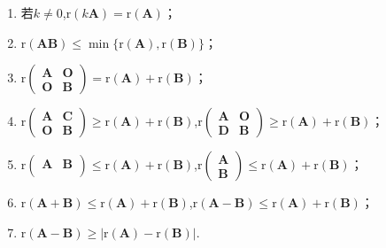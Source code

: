 \documentclass[lang=cn,newtx,10pt,scheme=chinese]{elegantbook}
\begin{document}
\begin{proposition}[矩阵秩的基本公式]\label{proposition:矩阵秩的基本公式}
\begin{enumerate}[(1)]
\item \label{矩阵秩的基本公式1}若\(k\neq0\),\(\mathrm{r}(k\boldsymbol{A})=\mathrm{r}(\boldsymbol{A})\)；

\item \label{矩阵秩的基本公式2}\(\mathrm{r}(\boldsymbol{A}\boldsymbol{B})\leq\min\{\mathrm{r}(\boldsymbol{A}),\mathrm{r}(\boldsymbol{B})\}\)；

\item \label{矩阵秩的基本公式3}\(\mathrm{r}\begin{pmatrix}\boldsymbol{A}&\boldsymbol{O}\\\boldsymbol{O}&\boldsymbol{B}\end{pmatrix}=\mathrm{r}(\boldsymbol{A})+\mathrm{r}(\boldsymbol{B})\)；

\item \label{矩阵秩的基本公式4}\(\mathrm{r}\begin{pmatrix}\boldsymbol{A}&\boldsymbol{C}\\\boldsymbol{O}&\boldsymbol{B}\end{pmatrix}\geq\mathrm{r}(\boldsymbol{A})+\mathrm{r}(\boldsymbol{B})\),\(\mathrm{r}\begin{pmatrix}\boldsymbol{A}&\boldsymbol{O}\\\boldsymbol{D}&\boldsymbol{B}\end{pmatrix}\geq\mathrm{r}(\boldsymbol{A})+\mathrm{r}(\boldsymbol{B})\)；

\item \label{矩阵秩的基本公式5}\(\mathrm{r}\left( \begin{matrix}
\boldsymbol{A}&		\boldsymbol{B}\\
\end{matrix} \right) \leq\mathrm{r}(\boldsymbol{A})+\mathrm{r}(\boldsymbol{B})\),\(\mathrm{r}\begin{pmatrix}\boldsymbol{A}\\\boldsymbol{B}\end{pmatrix}\leq\mathrm{r}(\boldsymbol{A})+\mathrm{r}(\boldsymbol{B})\)；

\item \label{矩阵秩的基本公式6}\(\mathrm{r}(\boldsymbol{A}+\boldsymbol{B})\leq\mathrm{r}(\boldsymbol{A})+\mathrm{r}(\boldsymbol{B})\),\(\mathrm{r}(\boldsymbol{A}-\boldsymbol{B})\leq\mathrm{r}(\boldsymbol{A})+\mathrm{r}(\boldsymbol{B})\)；

\item \label{矩阵秩的基本公式7}\(\mathrm{r}(\boldsymbol{A}-\boldsymbol{B})\geq|\mathrm{r}(\boldsymbol{A})-\mathrm{r}(\boldsymbol{B})|\).
\end{enumerate}
\end{proposition}
\end{document}

